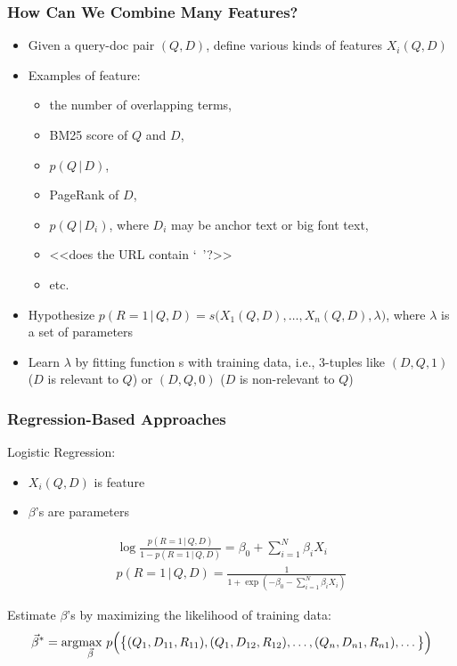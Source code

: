 \subsubsection{How Can We Combine Many Features?}
\begin{itemize}
\item Given a query-doc pair $(Q,D)$, define various kinds of features
$X_i(Q ,D)$
\item Examples of feature:
\begin{itemize}
\item the number of overlapping terms, 
\item BM25 score of $Q$ and $D$, 
\item $p(Q \,\big|\, D)$, 
\item PageRank of $D$, 
\item $p(Q \,\big|\, D_i)$, where $D_i$ may be anchor text or big font text, 
\item <<does the URL contain ‘~’?>> 
\item etc.
\end{itemize}
\item Hypothesize $p(R=1 \,\big|\, Q, D) = s\big( X_1(Q,D), \dots ,X_n(Q,D), \lambda \big)$, where $\lambda$ is a set of parameters
\item Learn $\lambda$ by fitting function s with training data, i.e., 3-tuples like $(D, Q, 1)$ ($D$ is relevant to $Q$) or $(D,Q,0)$ ($D$ is non-relevant to $Q$)
\end{itemize}

\subsubsection{Regression-Based Approaches}

Logistic Regression: 
\begin{itemize}
\item $X_i(Q,D)$ is feature
\item $\beta$’s are parameters
\end{itemize}

\begin{eqnarray*}
\log\frac{p(R=1 \,\big|\, Q, D)}{1-p(R=1 \,\big|\, Q, D)}=\beta_0 + \sum_{i=1}^{N} \beta_i X_i \\
p(R=1 \,\big|\, Q, D) = \frac{1}{1+\exp(-\beta_0 - \sum_{i=1}^{N} \beta_i X_i)}
\end{eqnarray*}

Estimate $\beta$’s by maximizing the likelihood of training data:
\begin{equation}
\vec{\beta}^* = \arg\!\max_{\vec{\beta}} \, p \Big( \big\{ (Q_1, D_{11}, R_{11}), (Q_1, D_{12}, R_{12}), \dots , (Q_n, D_{n1}, R_{n1}), \dots \big\} \Big)
\end{equation}


